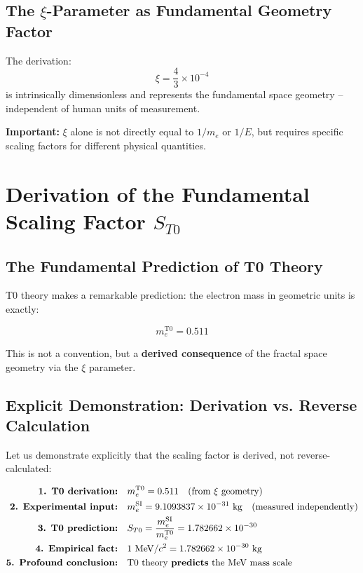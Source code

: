 \documentclass[12pt,a4paper]{article}
\begin{document}
	\subsection{The $\xi$-Parameter as Fundamental Geometry Factor}
	The derivation:
	\begin{equation}
		\xi = \frac{4}{3} \times 10^{-4}
	\end{equation}
	is intrinsically dimensionless and represents the fundamental space geometry -- independent of human units of measurement.
	
	\textbf{Important:} $\xi$ alone is not directly equal to $1/m_e$ or $1/E$, but requires specific scaling factors for different physical quantities.
	
	\section{Derivation of the Fundamental Scaling Factor $S_{T0}$}
	\label{sec:scaling-derivation}
	
	\subsection{The Fundamental Prediction of T0 Theory}
	
	T0 theory makes a remarkable prediction: the electron mass in geometric units is exactly:
	
	\begin{equation}
		m_e^{\mathrm{T0}} = 0.511
	\end{equation}
	
	This is not a convention, but a \textbf{derived consequence} of the fractal space geometry via the $\xi$ parameter.
	
	\subsection{Explicit Demonstration: Derivation vs. Reverse Calculation}
	
	Let us demonstrate explicitly that the scaling factor is derived, not reverse-calculated:
	
	\begin{align}
		\textbf{1. T0 derivation:} \quad & m_e^{\mathrm{T0}} = 0.511 \quad \text{(from $\xi$ geometry)} \\
		\textbf{2. Experimental input:} \quad & m_e^{\mathrm{SI}} = 9.1093837 \times 10^{-31}~\mathrm{kg} \quad \text{(measured independently)} \\
		\textbf{3. T0 prediction:} \quad & S_{T0} = \frac{m_e^{\mathrm{SI}}}{m_e^{\mathrm{T0}}} = 1.782662 \times 10^{-30} \\
		\textbf{4. Empirical fact:} \quad & 1~\mathrm{MeV}/c^2 = 1.782662 \times 10^{-30}~\mathrm{kg} \\
		\textbf{5. Profound conclusion:} \quad & \text{T0 theory \textbf{predicts} the MeV mass scale}
	\end{align}
	
\end{document}
